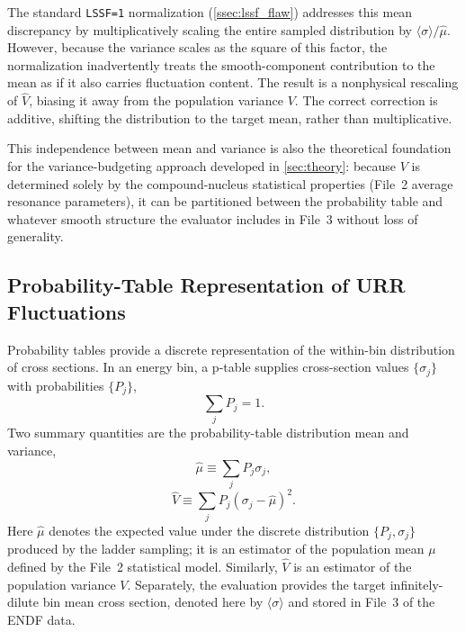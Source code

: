 \documentclass{style/nseJournal}
\newcommand{\sbin}{\langle \sigma \rangle}
\begin{document}
The standard \texttt{LSSF=1} normalization (\autoref{ssec:lssf_flaw}) addresses this mean discrepancy by multiplicatively scaling the entire sampled distribution by $\sbin/\hat{\mu}$. However, because the variance scales as the square of this factor, the normalization inadvertently treats the smooth-component contribution to the mean as if it also carries fluctuation content. The result is a nonphysical rescaling of $\hat{V}$, biasing it away from the population variance $V$. The correct correction is additive, shifting the distribution to the target mean, rather than multiplicative.

This independence between mean and variance is also the theoretical foundation for the variance-budgeting approach developed in \autoref{sec:theory}: because $V$ is determined solely by the compound-nucleus statistical properties (File~2 average resonance parameters), it can be partitioned between the probability table and whatever smooth structure the evaluator includes in File~3 without loss of generality.

\subsection{Probability-Table Representation of URR Fluctuations}
\label{ssec:ptable-background}

Probability tables provide a discrete representation of the within-bin distribution of cross sections\cite{Levitt1972Probability}. In an energy bin, a p-table supplies cross-section values $\{\sigma_j\}$ with probabilities $\{P_j\}$,
\begin{equation}
\sum_j P_j = 1.
\end{equation}
Two summary quantities are the probability-table distribution mean and variance,
\begin{equation}
\hat{\mu} \equiv \sum_j P_j \sigma_j,
\label{eq:mu_def}
\end{equation}
\begin{equation}
\hat{V} \equiv \sum_j P_j(\sigma_j-\hat{\mu})^2.
\label{eq:V_def}
\end{equation}
Here $\hat{\mu}$ denotes the expected value under the discrete distribution $\{P_j, \sigma_j\}$ produced by the ladder sampling; it is an estimator of the population mean $\mu$ defined by the File~2 statistical model. Similarly, $\hat{V}$ is an estimator of the population variance $V$. Separately, the evaluation provides the target infinitely-dilute bin mean cross section, denoted here by $\sbin$ and stored in File~3 of the ENDF data.
\end{document}
